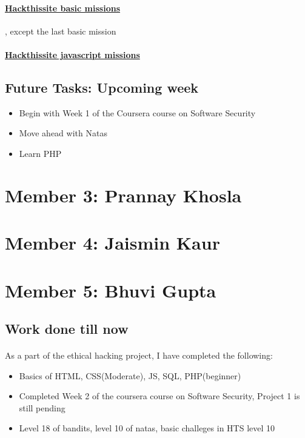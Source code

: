 \documentclass{article}
\begin{document}
\paragraph{\href{http://hackthissite.org/missions/basic}{Hackthissite basic missions}}, except the last basic mission

\paragraph{\href{http://hackthissite.org/missions/javascript}{Hackthissite javascript missions}}

\subsection*{Future Tasks: Upcoming week}
\begin{itemize}
    \item Begin with Week 1 of the Coursera course on Software Security
    \item Move ahead with Natas
    \item Learn PHP
\end{itemize}

\newpage
\section*{Member 3: Prannay Khosla}

\newpage
\section*{Member 4: Jaismin Kaur}

\newpage
\section*{Member 5: Bhuvi Gupta}
\subsection*{Work done till now}
\paragraph{}
As a part of the ethical hacking project, I have completed the following:
\begin{itemize}
    \item Basics of HTML, CSS(Moderate), JS, SQL, PHP(beginner)
    \item Completed Week 2 of the coursera course on Software Security, Project 1 is still pending
    \item Level 18 of bandits, level 10 of natas, basic challeges in HTS level 10
\end{itemize}
\end{document}
